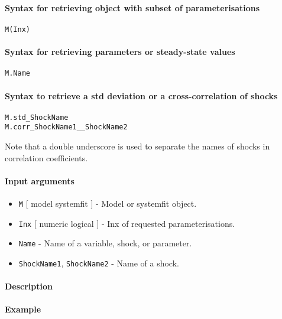 


	\paragraph{Syntax for retrieving object with subset of
parameterisations}

\begin{verbatim}
M(Inx)
\end{verbatim}

\paragraph{Syntax for retrieving parameters or steady-state
values}

\begin{verbatim}
M.Name
\end{verbatim}

\paragraph{Syntax to retrieve a std deviation or a cross-correlation of
shocks}

\begin{verbatim}
M.std_ShockName
M.corr_ShockName1__ShockName2
\end{verbatim}

Note that a double underscore is used to separate the names of shocks in
correlation coefficients.

\paragraph{Input arguments}

\begin{itemize}
\item
  \texttt{M} {[} model \textbar{} systemfit {]} - Model or systemfit
  object.
\item
  \texttt{Inx} {[} numeric \textbar{} logical {]} - Inx of requested
  parameterisations.
\item
  \texttt{Name} - Name of a variable, shock, or parameter.
\item
  \texttt{ShockName1}, \texttt{ShockName2} - Name of a shock.
\end{itemize}

\paragraph{Description}

\paragraph{Example}


